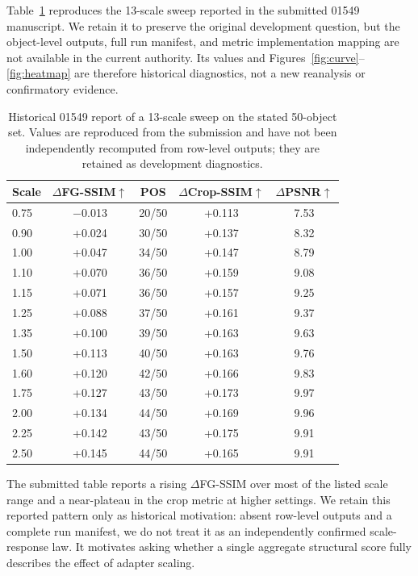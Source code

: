 \documentclass[times,twocolumn,final]{elsarticle}
\begin{document}
Table~\ref{tab:sweep} reproduces the 13-scale sweep reported in the submitted 01549 manuscript. We retain it to preserve the original development question, but the object-level outputs, full run manifest, and metric implementation mapping are not available in the current authority. Its values and Figures~\ref{fig:curve}--\ref{fig:heatmap} are therefore historical diagnostics, not a new reanalysis or confirmatory evidence.

\begin{table}[t]
\centering
\caption{Historical 01549 report of a 13-scale sweep on the stated 50-object set. Values are reproduced from the submission and have not been independently recomputed from row-level outputs; they are retained as development diagnostics.}
\label{tab:sweep}
\small
\begin{tabular}{lcccc}
\toprule
Scale & $\Delta$FG-SSIM$\uparrow$ & POS & $\Delta$Crop-SSIM$\uparrow$ & $\Delta$PSNR$\uparrow$ \\
\midrule
0.75 & $-$0.013 & 20/50 & +0.113 & 7.53 \\
0.90 & +0.024 & 30/50 & +0.137 & 8.32 \\
1.00 & +0.047 & 34/50 & +0.147 & 8.79 \\
1.10 & +0.070 & 36/50 & +0.159 & 9.08 \\
1.15 & +0.071 & 36/50 & +0.157 & 9.25 \\
1.25 & +0.088 & 37/50 & +0.161 & 9.37 \\
1.35 & +0.100 & 39/50 & +0.163 & 9.63 \\
1.50 & +0.113 & 40/50 & +0.163 & 9.76 \\
1.60 & +0.120 & 42/50 & +0.166 & 9.83 \\
1.75 & +0.127 & 43/50 & +0.173 & 9.97 \\
2.00 & +0.134 & 44/50 & +0.169 & 9.96 \\
2.25 & +0.142 & 43/50 & +0.175 & 9.91 \\
2.50 & +0.145 & 44/50 & +0.165 & 9.91 \\
\bottomrule
\end{tabular}
\end{table}

The submitted table reports a rising $\Delta$FG-SSIM over most of the listed scale range and a near-plateau in the crop metric at higher settings. We retain this reported pattern only as historical motivation: absent row-level outputs and a complete run manifest, we do not treat it as an independently confirmed scale-response law. It motivates asking whether a single aggregate structural score fully describes the effect of adapter scaling.
\end{document}
